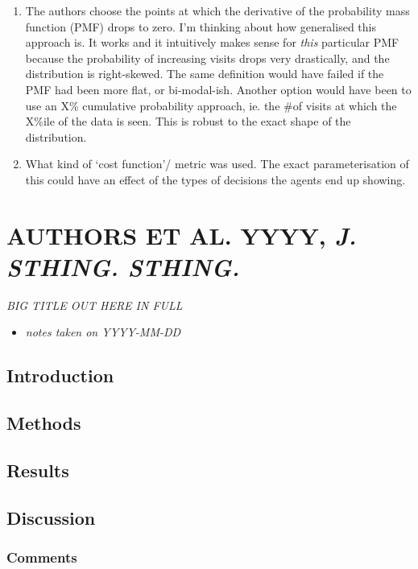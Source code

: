 \documentclass[
]{book}
\providecommand{\tightlist}{%
  \setlength{\itemsep}{0pt}\setlength{\parskip}{0pt}}
\begin{document}
\begin{enumerate}
\item
  The authors choose the points at which the derivative of the probability mass function (PMF) drops to zero. I'm thinking about how generalised this approach is. It works and it intuitively makes sense for \emph{this} particular PMF because the probability of increasing visits drops very drastically, and the distribution is right-skewed. The same definition would have failed if the PMF had been more flat, or bi-modal-ish. Another option would have been to use an X\% cumulative probability approach, ie. the \#of visits at which the X\%ile of the data is seen. This is robust to the exact shape of the distribution.
\item
  What kind of `cost function'/ metric was used. The exact parameterisation of this could have an effect of the types of decisions the agents end up showing.
\end{enumerate}

\hypertarget{authors-et-al.-yyyy-j.-sthing.-sthing.}{%
\chapter{\texorpdfstring{AUTHORS ET AL. YYYY, \emph{J. STHING. STHING.}}{AUTHORS ET AL. YYYY, J. STHING. STHING.}}\label{authors-et-al.-yyyy-j.-sthing.-sthing.}}


\emph{BIG TITLE OUT HERE IN FULL} \citep{schuchmannsiemers2010a}

\begin{itemize}
\tightlist
\item
  \emph{notes taken on YYYY-MM-DD}
\end{itemize}

\hypertarget{introduction}{%
\section{Introduction}\label{introduction}}

\hypertarget{methods}{%
\section{Methods}\label{methods}}

\hypertarget{results}{%
\section{Results}\label{results}}

\hypertarget{discussion}{%
\section{Discussion}\label{discussion}}

\hypertarget{comments}{%
\subsection{Comments}\label{comments}}

  
\end{document}
